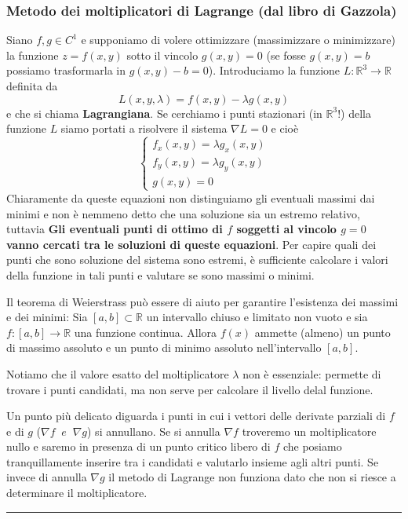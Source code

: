 \subsubsection*{Metodo dei moltiplicatori di Lagrange (dal libro di Gazzola)}
\begin{tcolorbox}
Siano $f,g \in C^1$ e supponiamo di volere ottimizzare (massimizzare o minimizzare) la funzione $z = f(x,y)$ sotto il vincolo $g(x,y) = 0$ (se fosse $g(x,y) = b$ possiamo trasformarla in $g(x,y) - b = 0$). Introduciamo la funzione $L : \mathbb{R}^3 \rightarrow \mathbb{R}$ definita da
\[
    L(x,y,\lambda) = f(x,y) - \lambda g(x,y)
\]
e che si chiama \textbf{Lagrangiana}. Se cerchiamo i punti stazionari (in $\mathbb{R}^3$!) della funzione $L$ siamo portati a risolvere il sistema $\nabla L = 0$ e cioè
\[
    \begin{cases}
        f_x(x,y) = \lambda g_x(x,y) \\  
        f_y (x,y) = \lambda g_y(x,y)\\
        g(x,y) = 0
    \end{cases}
\]
Chiaramente da queste equazioni non distinguiamo gli eventuali massimi dai minimi e non è nemmeno detto che una soluzione sia un estremo relativo, tuttavia 
\textbf{Gli eventuali punti di ottimo di $f$ soggetti al vincolo $g = 0$ vanno cercati tra le soluzioni di queste equazioni}.\newline
Per capire quali dei punti che sono soluzione del sistema sono estremi, è sufficiente calcolare i valori della funzione in tali punti e valutare se sono massimi o minimi.
\end{tcolorbox}
\begin{tcolorbox}
Il teorema di Weierstrass può essere di aiuto per garantire l'esistenza dei massimi e dei minimi: Sia $[a,b]\subset \mathbb {R}$ un intervallo chiuso e limitato non vuoto e sia $f\colon [a,b]\to \mathbb {R}$ una funzione continua. Allora $f(x)$ ammette (almeno) un punto di massimo assoluto e un punto di minimo assoluto nell'intervallo $[a,b]$.
\end{tcolorbox}
\begin{tcolorbox}
Notiamo che il valore esatto del moltiplicatore $\lambda$ non è essenziale: permette di trovare i punti candidati, ma non serve per calcolare il livello delal funzione.
\end{tcolorbox}
\begin{tcolorbox}
Un punto più delicato diguarda i punti in cui i vettori delle derivate parziali di $f$ e di $g$ ($\nabla f \;\;e \;\; \nabla g$) si annullano. Se si annulla $\nabla f$ troveremo un moltiplicatore nullo e saremo in presenza di un punto critico libero di $f$ che posiamo tranquillamente inserire tra i candidati e valutarlo insieme agli altri punti. Se invece di annulla $\nabla g$ il metodo di Lagrange non funziona dato che non si riesce a determinare il moltiplicatore.
\end{tcolorbox}
\rule{\textwidth}{0,4pt}
